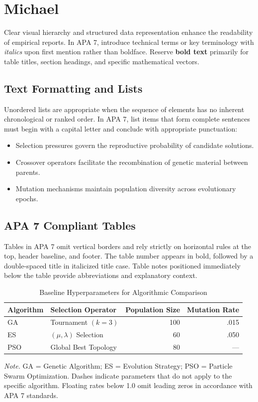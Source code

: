 \section{Michael}
Clear visual hierarchy and structured data representation enhance the readability of empirical reports.
In APA 7, introduce technical terms or key terminology with \textit{italics} upon first mention rather than boldface.
Reserve \textbf{bold text} primarily for table titles, section headings, and specific mathematical vectors.

\subsection{Text Formatting and Lists}
Unordered lists are appropriate when the sequence of elements has no inherent chronological or ranked order.
In APA 7, list items that form complete sentences must begin with a capital letter and conclude with appropriate punctuation:
\begin{itemize}
    \item Selection pressures govern the reproductive probability of candidate solutions.
    \item Crossover operators facilitate the recombination of genetic material between parents.
    \item Mutation mechanisms maintain population diversity across evolutionary epochs.
\end{itemize}

\subsection{APA 7 Compliant Tables}
Tables in APA 7 omit vertical borders and rely strictly on horizontal rules at the top, header baseline, and footer.
The table number appears in bold, followed by a double-spaced title in italicized title case.
Table notes positioned immediately below the table provide abbreviations and explanatory context.

\begin{table}[htbp]
\caption{Baseline Hyperparameters for Algorithmic Comparison}
\label{tab:hyperparameters}
\begin{threeparttable}
\begin{tabular}{llrr}
\toprule
Algorithm & Selection Operator & Population Size & Mutation Rate \\
\midrule
GA & Tournament \((k=3)\) & 100 & .015 \\
ES & \((\mu, \lambda)\) Selection & 60 & .050 \\
PSO & Global Best Topology & 80 & --- \\
\bottomrule
\end{tabular}
\begin{tablenotes}[flushleft]
\small
\item \textit{Note.} GA = Genetic Algorithm; ES = Evolution Strategy; PSO = Particle Swarm Optimization. Dashes indicate parameters that do not apply to the specific algorithm. Floating rates below 1.0 omit leading zeros in accordance with APA 7 standards.
\end{tablenotes}
\end{threeparttable}
\end{table}
